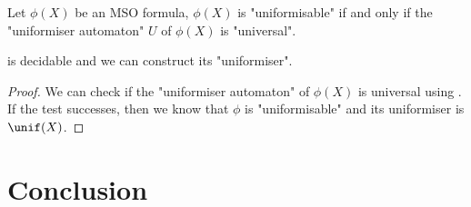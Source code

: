 \documentclass[a4paper,UKenglish,cleveref, autoref, thm-restate]{lipics-v2021}
\begin{document}
\begin{theorem}
	Let $\phi(X)$ be an MSO formula, $\phi(X)$ is "uniformisable" if and only if the "uniformiser automaton" $U$ of $\phi(X)$ is "universal".
\end{theorem}

\begin{coro}
	 is decidable and we can construct its "uniformiser". 
\end{coro}

\begin{proof}
	We can check if the "uniformiser automaton" of $\phi(X)$ is universal using . If the test successes,
	then we know that $\phi$ is "uniformisable" and its uniformiser is $\unif(X)$.
\end{proof}

\section{Conclusion}





\end{document}

